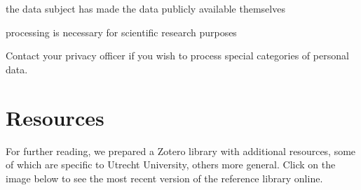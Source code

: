 \documentclass[
]{book}
\begin{document}
the data subject has made the data publicly available themselves

processing is necessary for scientific research purposes

Contact your privacy officer if you wish to process special categories of personal data.

\hypertarget{references}{%
\chapter{Resources}\label{references}}

For further reading, we prepared a Zotero library with additional resources, some
of which are specific to Utrecht University, others more general. Click on the
image below to see the most recent version of the reference library online.

  
\end{document}
